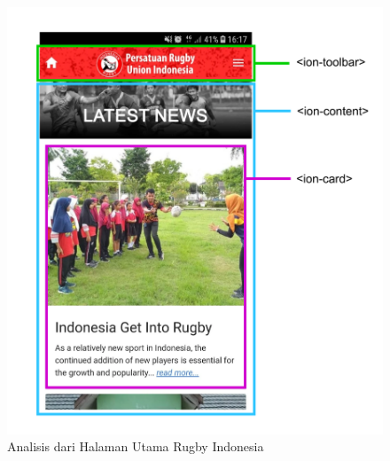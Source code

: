 \begin{figure} [H]
    \centering
    \includegraphics[scale=0.1]{Gambar/latest_news-analytics.png}
    \caption{Analisis dari Halaman Utama Rugby Indonesia}
    \label{fig:homepage-analytics}
\end{figure}





